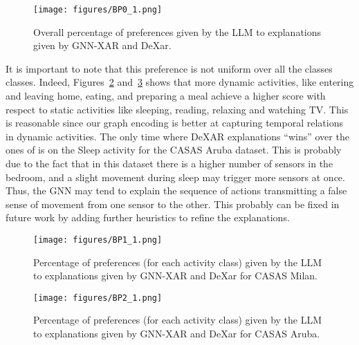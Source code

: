 \begin{figure}
\centering   \texttt{[image: figures/BP0\_1.png]}
    \caption[Explanation evaluation]{Overall percentage of preferences given by the LLM to explanations given by GNN-XAR and DeXar.}
    \label{fig:BP0}
\end{figure}

It is important to note that this preference is not uniform over all the classes classes. Indeed, Figures~\ref{fig:BP1} and~\ref{fig:BP2} shows that more dynamic activities, like entering and leaving home, eating, and preparing a meal achieve a higher score with respect to static activities like sleeping, reading, relaxing and watching TV.
This is reasonable since our graph encoding is better at capturing temporal relations in dynamic activities.
The only time where DeXAR explanations ``wins'' over the ones of \acronym{} is on the Sleep activity for the CASAS Aruba dataset. This is probably due to the fact that in this dataset there is a higher number of sensors in the bedroom, and a slight movement during sleep may trigger more sensors at once. Thus, the GNN may tend to explain the sequence of actions transmitting a false sense of movement from one sensor to the other. This probably can be fixed in future work by adding further heuristics to refine the explanations.

\begin{figure}
\centering   \texttt{[image: figures/BP1\_1.png]}
    \caption[Explanation evaluation class by class on CASAS Milan]{Percentage of preferences (for each activity class) given by the LLM to explanations given by GNN-XAR and DeXar for CASAS Milan.}
    \label{fig:BP1}
\end{figure}

\begin{figure}
\centering   \texttt{[image: figures/BP2\_1.png]}
    \caption[Explanation evaluation class by class on CASAS Aruba]{Percentage of preferences (for each activity class) given by the LLM to explanations given by GNN-XAR and DeXar for CASAS Aruba.}
    \label{fig:BP2}
\end{figure}

